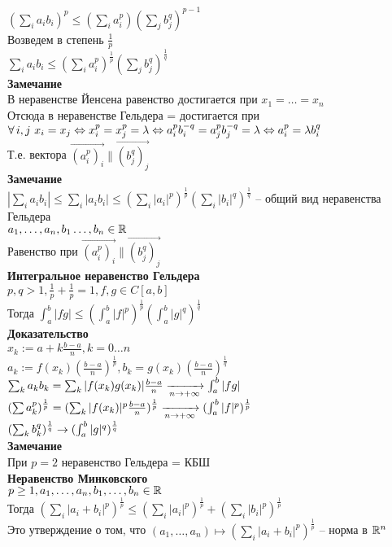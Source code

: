 \documentclass[12pt]{article}
\begin{document}
$(\sum_i a_i b_i)^p \leq (\sum_i a_i^p)(\sum_j b_j^q)^{p-1}$\\
Возведем в степень $\frac1p$\\
$\sum_i a_ib_i \leq (\sum_i a_i^p)^{\frac1p}(\sum_j b_j^q)^{\frac1q}$\\
\textbf{Замечание}\\
В неравенстве Йенсена равенство достигается при $x_1 = \ldots = x_n$\\
Отсюда в неравенстве Гельдера = достигается при $\forall\, i,j\ x_i = x_j \Leftrightarrow x_i^p = x_j^p = \lambda \Leftrightarrow a_i^pb_i^{-q} = a_j^pb_j^{-q} = \lambda \Leftrightarrow a_i^p = \lambda b_i^q$\\
Т.е. вектора $\vec{(a_i^p)_i} \| \vec{(b_j^q)_j}$\\
\textbf{Замечание}\\
$|\sum_i a_i b_i| \leq \sum_i |a_i b_i| \leq (\sum_i |a_i|^p)^{\frac1p}(\sum_i |b_i|^q)^{\frac1q}$ -- общий вид неравенства Гельдера\\
$a_1, \ldots, a_n, b_1 \ldots, b_n \in \mathbb{R}$\\
Равенство при $\vec{(a_i^p)_i} \| \vec{(b_j^q)_j}$\\
\textbf{Интегральное неравенство Гельдера}\\
$p,q > 1, \frac1p + \frac1p = 1, f,g \in C[a,b]$\\
Тогда $\int_a^b |fg| \leq (\int_a^b |f|^p)^{\frac1p}(\int_a^b |g|^q)^{\frac1q}$\\
\textbf{Доказательство}\\
$x_k := a+k\frac{b-a}n, k = 0\ldots n$\\
$a_k := f(x_k) (\frac{b-a}n)^{\frac1p}, b_k = g(x_k)(\frac{b-a}n)^{\frac1q}$\\
$\sum_k a_k b_k = \sum_k |f(x_k)g(x_k)|\frac{b-a}n \xrightarrow[n\rightarrow +\infty]{} \int_a^b |fg|$\\
$(\sum a_k^p)^{\frac1p} = (\sum_k |f(x_k)|^p \frac{b-a}n)^{\frac1p} \xrightarrow[n\rightarrow +\infty]{} (\int_a^b |f|^p)^\frac1p$\\
$(\sum_k b_k^q)^{\frac1q} \rightarrow (\int_a^b |g|^q)^{\frac1q}$\\
\textbf{Замечание}\\
При $p=2$ неравенство Гельдера = КБШ\\
\textbf{Неравенство Минковского}\\
$p\geq 1, a_1, \ldots, a_n, b_1, \ldots, b_n \in \mathbb{R}$\\
Тогда $(\sum_i |a_i+b_i|^p)^{\frac1p} \leq (\sum_i |a_i|^p)^{\frac1p} + (\sum_i |b_i|^p)^{\frac1p}$\\
Это утверждение о том, что $(a_1, \ldots, a_n) \mapsto (\sum_i |a_i+b_i|^p)^{\frac1p}$ -- норма в $\mathbb{R}^n$\\
\end{document}
